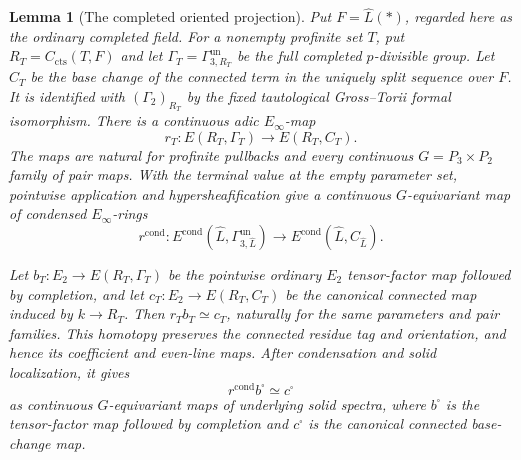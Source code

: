 \documentclass[11pt]{article}
\numberwithin{equation}{section}
\newtheorem{lemma}[theorem]{Lemma}
\theoremstyle{definition}
\theoremstyle{remark}
\begin{document}
\begin{lemma}[The completed oriented projection]
\label{lem:completed-oriented-map}
Put \(F=\widehat L(*)\), regarded here as the ordinary completed field.
For a nonempty profinite set \(T\), put \(R_T=C_{\mathrm{cts}}(T,F)\) and let
\(\Gamma_T=\Gamma^{\mathrm{un}}_{3,R_T}\) be the full completed
\(p\)-divisible group. Let \(C_T\) be the base change of the connected
term in the uniquely split sequence over \(F\). It is identified with
\((\Gamma_2)_{R_T}\) by the fixed tautological Gross--Torii formal
isomorphism. There is a continuous adic \(E_\infty\)-map
\[
 r_T:E(R_T,\Gamma_T)\longrightarrow E(R_T,C_T).
\]
The maps are natural for profinite pullbacks and every continuous
\(G=P_3\times P_2\) family of pair maps. With the terminal value at the
empty parameter set, pointwise application and hypersheafification give
a continuous \(G\)-equivariant map of condensed \(E_\infty\)-rings
\[
 r^{\mathrm{cond}}:
 E^{\mathrm{cond}}(\widehat L,\Gamma^{\mathrm{un}}_{3,\widehat L})
 \longrightarrow E^{\mathrm{cond}}(\widehat L,C_{\widehat L}).
\]

Let \(b_T:E_2\to E(R_T,\Gamma_T)\) be the pointwise ordinary
\(E_2\) tensor-factor map followed by completion, and let
\(c_T:E_2\to E(R_T,C_T)\) be the canonical connected map induced by
\(k\to R_T\). Then \(r_Tb_T\simeq c_T\), naturally for the same
parameters and pair families. This homotopy preserves the connected
residue tag and orientation, and hence its coefficient and even-line maps.
After condensation and solid localization, it gives
\[
 r^{\mathrm{cond}}b^\square\simeq c^\square
\]
as continuous \(G\)-equivariant maps of underlying solid spectra, where
\(b^\square\) is the tensor-factor map followed by completion and
\(c^\square\) is the canonical connected base-change map.
\end{lemma}
\end{document}
